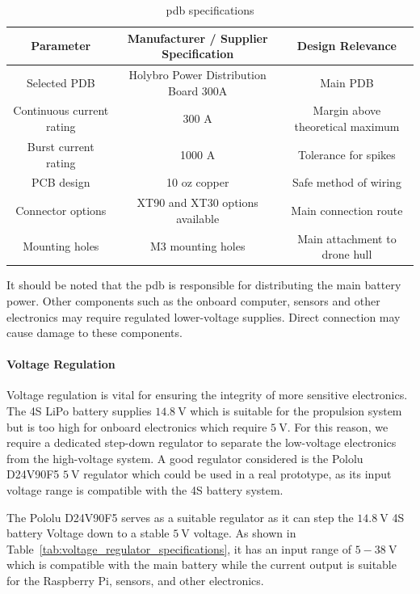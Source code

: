 \documentclass{report_template_oxford}
\begin{document}
\begin{table}[htbp]
\centering
\caption[\gls{pdb} specifications]{\gls{pdb} specifications\footnotemark}
\label{tab:pdb_specifications}
\begin{tabular}{|c|c|c|}
\hline
\textbf{Parameter} & \textbf{Manufacturer / Supplier Specification} & \textbf{Design Relevance} \\
\hline
Selected PDB & Holybro Power Distribution Board 300A & Main  PDB \\
\hline
Continuous current rating & 300 A & Margin above theoretical maximum \\
\hline
Burst current rating & 1000 A & Tolerance for spikes \\
\hline
PCB design & 10 oz copper & Safe method of wiring \\
\hline
Connector options & XT90 and XT30 options available & Main connection route \\
\hline
Mounting holes & M3 mounting holes & Main attachment to drone hull \\
\hline
\end{tabular}
\end{table}


It should be noted that the \gls{pdb} is responsible for distributing the main battery power. Other components such as the onboard computer, sensors and other electronics may require regulated lower-voltage supplies. Direct connection may cause damage to these components.

\paragraph{Voltage Regulation}

Voltage regulation is vital for ensuring the integrity of more sensitive electronics. The 4S LiPo battery supplies \(14.8~\text{V}\) which is suitable for the propulsion system but is too high for onboard electronics which require \(5~\text{V}\). For this reason, we require a dedicated step-down regulator to separate the low-voltage electronics from the high-voltage system. A good regulator considered is the Pololu D24V90F5 \(5~\text{V}\) regulator which could be used in a real prototype, as its input voltage range is compatible with the 4S battery system.

The Pololu D24V90F5 serves as a suitable regulator as it can step the \(14.8~\text{V}\) 4S battery Voltage down to a stable \(5~\text{V}\) voltage. As shown in Table~\ref{tab:voltage_regulator_specifications}, it has an input range of \(5-38~\text{V}\) which is compatible with the main battery while the current output is suitable for the Raspberry Pi, sensors, and other electronics.
\end{document}
